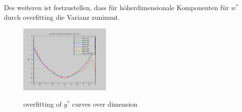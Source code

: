 \documentclass[]{report}
\begin{document}
Des weiteren ist festzustellen, dass f\"ur h\"oherdimensionale Komponenten f\"ur $w^*$ durch overfitting die Varianz zunimmt.
\begin{figure}[h]
\centering
\includegraphics[width=0.4\textwidth]{./images/f_x_w_star_overDimensions.png} \\
\caption{overfitting of $y^*$ curves over dimension}
\label{tab:Overfitting}
\end{figure}
\end{document}
